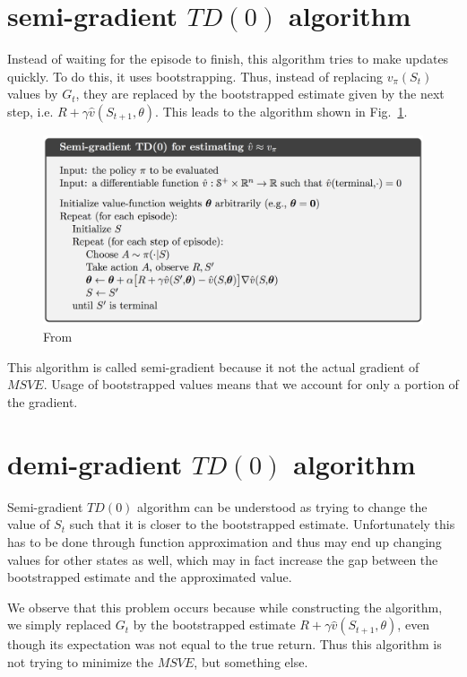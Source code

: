 \documentclass{article}
\begin{document}
\section{semi-gradient $TD(0)$ algorithm}

Instead of waiting for the episode to finish, this algorithm tries to make updates quickly. To do this, it uses bootstrapping. Thus, instead of replacing $v_{\pi}(S_t)$ values by $G_t$, they are replaced by the bootstrapped estimate given by the next step, i.e. $R + \gamma \hat{v}(S_{t+1}, \theta)$. This leads to the algorithm shown in Fig.~\ref{fig:semi_alg}.
\begin{figure}
    \centering
    \includegraphics[width=\textwidth]{semi_alg}
    \caption{From~\cite{RLbook}}\label{fig:semi_alg}
\end{figure}

This algorithm is called semi-gradient because it not the actual gradient of $MSVE$\@. Usage of bootstrapped values means that we account for only a portion of the gradient.

\section{demi-gradient $TD(0)$ algorithm}

Semi-gradient $TD(0)$ algorithm can be understood as trying to change the value of $S_t$ such that it is closer to the bootstrapped estimate. Unfortunately this has to be done through function approximation and thus may end up changing values for other states as well, which may in fact increase the gap between the bootstrapped estimate and the approximated value.

We observe that this problem occurs because while constructing the algorithm, we simply replaced $G_t$ by the bootstrapped estimate $R + \gamma \hat{v}(S_{t+1}, \theta)$, even though its expectation was not equal to the true return. Thus this algorithm is not trying to minimize the $MSVE$, but something else.
\end{document}
